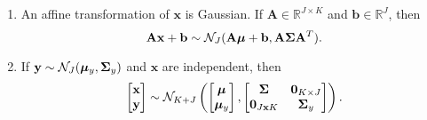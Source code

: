 \begin{theorem}
\begin{enumerate}
        \item
            An affine transformation of $\mathbf{x}$ is Gaussian.
            If $\mathbf{A} \in \mathbb{R}^{J \times K}$ and $\mathbf{b} \in \mathbb{R}^{J}$, then
            \begin{equation*}
                \mathbf{Ax} + \mathbf{b} \sim \mathcal{N}_J(
                \mathbf{A} \boldsymbol{\mu} + \mathbf{b},
                \mathbf{A} \boldsymbol{\Sigma} \mathbf{A}^{T}
                ).
            \end{equation*}

        \item
            If $\mathbf{y} \sim \mathcal{N}_J( \boldsymbol{\mu}_y, \boldsymbol{\Sigma}_{y})$ and $\mathbf{x}$ are independent, then
            \begin{equation*}
                \begin{bmatrix}
                    \mathbf{x} \\
                    \mathbf{y}
                \end{bmatrix}
                \sim \mathcal{N}_{K + J} \left(
                \begin{bmatrix}
                        \boldsymbol{\mu} \\
                        \boldsymbol{\mu}_{y}
                    \end{bmatrix}
                ,
                \begin{bmatrix}
                        \boldsymbol{\Sigma} & \mathbf{0}_{K \times J} \\
                        \mathbf{0}_{J \mathbf{x}
                        K} & \boldsymbol{\Sigma}_y
                    \end{bmatrix}
                \right).
            \end{equation*}
    \end{enumerate}
\end{theorem}
